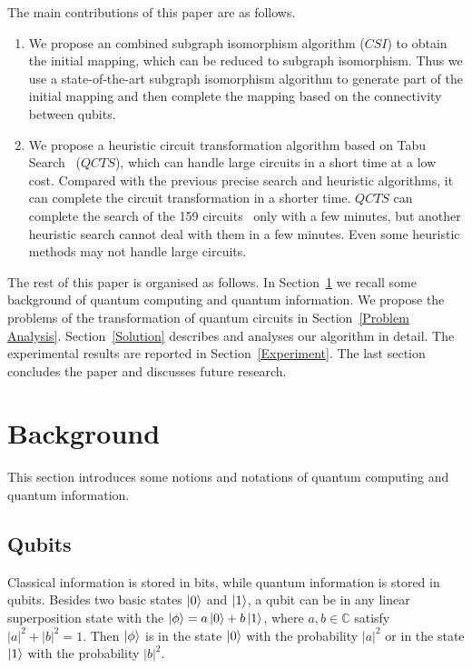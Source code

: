 \documentclass[runningheads]{llncs}
\begin{document}
The main contributions of this paper are as follows.
	\begin{enumerate}
		\item We propose an combined subgraph isomorphism algorithm ($CSI$) to obtain the initial mapping, which can be reduced to subgraph isomorphism. Thus we use a state-of-the-art subgraph isomorphism algorithm to generate part of the initial mapping and then complete the mapping based on the connectivity between qubits.
		\item We propose a heuristic circuit transformation algorithm based on Tabu Search~\cite{Glover1990} ($QCTS$), which can handle large circuits in a short time at a low cost. Compared with the previous precise search and heuristic algorithms, it can complete the circuit transformation in a shorter time. $QCTS$ can complete the search of the 159 circuits~\cite{Zulehner2017} only with a few minutes, but another heuristic search cannot deal with them in a few minutes. Even some heuristic methods may not handle large circuits.
	\end{enumerate}

The rest of this paper is organised as follows.
In Section~\ref{Background} we recall some background of quantum computing and quantum information.
We propose the problems of the transformation of quantum circuits in Section~\ref{Problem Analysis}.
Section~\ref{Solution} describes and analyses our algorithm in detail.
The experimental results are reported in Section~\ref{Experiment}. 
The last section concludes the paper and discusses future research.


\section{Background}
\label{Background}
This section introduces some notions and notations of quantum computing and quantum information.

\subsection{Qubits}
Classical information is stored in bits, while quantum information is stored in qubits. 
Besides two basic states $\left\vert{0}\right\rangle$ and $\left\vert{1}\right\rangle$,
a qubit can be in any linear superposition state with the $\left\vert{\phi}\right\rangle=a\left\vert{0}\right\rangle+b\left\vert{1}\right\rangle$,
where $a,b\in \mathbb{C}$ satisfy $|a|^{2}+|b|^{2}=1$.
Then $\left\vert{\phi}\right\rangle$ is in the state $\left\vert{0}\right\rangle$ with the probability $|a|^{2}$ or in the state $\left\vert{1}\right\rangle$ with the probability $|b|^{2}$.
\end{document}
